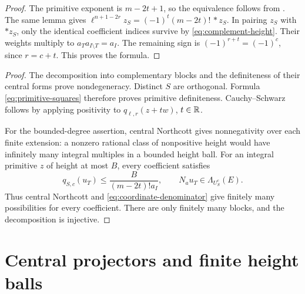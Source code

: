 \documentclass[11pt,a4paper]{article}
\newtheorem{corollary}[theorem]{Corollary}
\theoremstyle{definition}
\DeclareRobustCommand{\MathEqref}[1]{\begingroup\hypersetup{linkcolor=MathEquationLink}\eqref{#1}\endgroup}
\numberwithin{equation}{section}
\begin{document}
\begin{proof}
The primitive exponent is \(m-2t+1\), so the equivalence follows
from . The same lemma gives
\(\ell^{n+1-2r}z_S=(-1)^t(m-2t)!\,*z_S\).
In pairing \(z_S\) with \(*z_S\), only the identical coefficient
indices survive by \MathEqref{eq:complement-height}. Their weights
multiply to \(a_Ta_{I\setminus T}=a_I\). The remaining sign is
\((-1)^{r+t}=(-1)^c\), since \(r=c+t\). This proves the formula.
\end{proof}


\begin{proof}
The decomposition into complementary blocks and the definiteness
of their central forms prove nondegeneracy. Distinct \(S\) are
orthogonal. Formula \MathEqref{eq:primitive-squares} therefore
proves primitive definiteness. Cauchy--Schwarz follows by applying
positivity to \(q_{\ell,r}(z+tw)\), \(t\in\mathbb R\).

For the bounded-degree assertion, central Northcott gives
nonnegativity over each finite extension: a nonzero rational class
of nonpositive height would have infinitely many integral multiples
in a bounded height ball. For an integral primitive \(z\) of
height at most \(B\), every
coefficient satisfies
\[
 q_{S,c}(u_T)\le
   \frac{B}{(m-2t)!a_I},\qquad
 N_a u_T\in\Lambda_{U_S^c}(E).
\]
Thus central Northcott and \MathEqref{eq:coordinate-denominator}
give finitely many possibilities for every coefficient. There are
only finitely many blocks, and the decomposition is injective.
\end{proof}




\section{Central projectors and finite height balls}\label{sec:setup}
\end{document}
